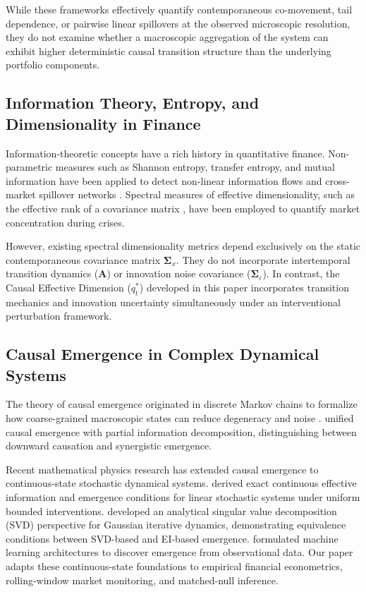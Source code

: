 \documentclass[review,12pt,authoryear]{elsarticle}
\begin{document}
While these frameworks effectively quantify contemporaneous co-movement, tail dependence, or pairwise linear spillovers at the observed microscopic resolution, they do not examine whether a macroscopic aggregation of the system can exhibit higher deterministic causal transition structure than the underlying portfolio components.

\subsection{Information Theory, Entropy, and Dimensionality in Finance}
Information-theoretic concepts have a rich history in quantitative finance. Non-parametric measures such as Shannon entropy, transfer entropy, and mutual information have been applied to detect non-linear information flows and cross-market spillover networks \citep{schreiber2000measuring, dimpfl2013using, bekiros2017information}. Spectral measures of effective dimensionality, such as the effective rank of a covariance matrix \citep{roy2007effective}, have been employed to quantify market concentration during crises.

However, existing spectral dimensionality metrics depend exclusively on the static contemporaneous covariance matrix $\boldsymbol{\Sigma}_x$. They do not incorporate intertemporal transition dynamics ($\mathbf{A}$) or innovation noise covariance ($\boldsymbol{\Sigma}_\varepsilon$). In contrast, the Causal Effective Dimension ($q_t^*$) developed in this paper incorporates transition mechanics and innovation uncertainty simultaneously under an interventional perturbation framework.

\subsection{Causal Emergence in Complex Dynamical Systems}
The theory of causal emergence originated in discrete Markov chains to formalize how coarse-grained macroscopic states can reduce degeneracy and noise \citep{hoel2013quantifying, hoel2017when, klein2020emergence}. \citet{rosas2020reconciling} unified causal emergence with partial information decomposition, distinguishing between downward causation and synergistic emergence.

Recent mathematical physics research has extended causal emergence to continuous-state stochastic dynamical systems. \citet{liu2024exact} derived exact continuous effective information and emergence conditions for linear stochastic systems under uniform bounded interventions. \citet{liu2025singular} developed an analytical singular value decomposition (SVD) perspective for Gaussian iterative dynamics, demonstrating equivalence conditions between SVD-based and EI-based emergence. \citet{yang2025finding} formulated machine learning architectures to discover emergence from observational data. Our paper adapts these continuous-state foundations to empirical financial econometrics, rolling-window market monitoring, and matched-null inference.
\end{document}
